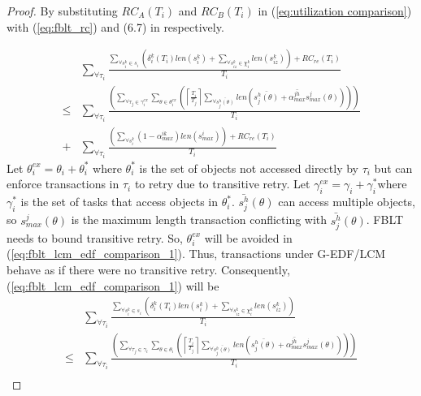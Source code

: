 \documentclass[12pt,english]{report}
\newtheorem{proof}{Proof}
\begin{document}
\begin{proof}

By substituting $RC_{A}(T_{i})$ and $RC_{B}(T_{i})$ in (\ref{eq:utilization comparison})
with (\ref{eq:fblt_rc}) and (6.7) in \cite{shambake_phd_proposal}
respectively. 

\begin{eqnarray}
 & \sum_{\forall\tau_{i}}\frac{\sum_{\forall s_{i}^{k}\in s_{i}}\left(\delta_{i}^{k}(T_{i})len(s_{i}^{k})+\sum_{\forall s_{iz}^{k}\in\chi_{i}^{k}}len(s_{iz}^{k})\right)+RC_{re}(T_{i})}{T_{i}}\label{eq:fblt_lcm_edf_comparison_1}\\
\le & \sum_{\forall\tau_{i}}\frac{\left(\sum_{\forall\tau_{j}\in\gamma_{i}^{ex}}\sum_{\theta\in\theta_{i}^{ex}}\left(\left\lceil \frac{T_{i}}{T_{j}}\right\rceil \sum_{\forall\bar{s_{j}^{h}(\theta)}}len\left(\bar{s_{j}^{h}(\theta)}+\bar{\alpha_{max}^{jh}}s_{max}^{j}(\theta)\right)\right)\right)}{T_{i}}\nonumber \\
+ & \sum_{\forall\tau_{i}}\frac{\left(\sum_{\forall s_{i}^{k}}\left(1-\alpha_{max}^{ik}\right)len\left(s_{max}^{i}\right)\right)+RC_{re}(T_{i})}{T_{i}}\nonumber 
\end{eqnarray}
Let $\theta_{i}^{ex}=\theta_{i}+\theta_{i}^{*}$ where $\theta_{i}^{*}$
is the set of objects not accessed directly by $\tau_{i}$ but can
enforce transactions in $\tau_{i}$ to retry due to transitive retry.
Let $\gamma_{i}^{ex}=\gamma_{i}+\gamma_{i}^{*}$where $\gamma_{i}^{*}$
is the set of tasks that access objects in $\theta_{i}^{*}$. $\bar{s_{j}^{h}}(\theta)$
can access multiple objects, so $s_{max}^{j}(\theta)$ is the maximum
length transaction conflicting with $\bar{s_{j}^{h}}(\theta)$. FBLT
needs to bound transitive retry. So, $\theta_{i}^{ex}$ will be avoided
in (\ref{eq:fblt_lcm_edf_comparison_1}). Thus, transactions under G-EDF/LCM
behave as if there were no transitive retry. Consequently, (\ref{eq:fblt_lcm_edf_comparison_1})
will be 
\begin{eqnarray}
 & \sum_{\forall\tau_{i}}\frac{\sum_{\forall s_{i}^{k}\in s_{i}}\left(\delta_{i}^{k}(T_{i})len(s_{i}^{k})+\sum_{\forall s_{iz}^{k}\in\chi_{i}^{k}}len(s_{iz}^{k})\right)}{T_{i}}\label{eq:fblt_lcm_edf_comparison_2}\\
\le & \sum_{\forall\tau_{i}}\frac{\left(\sum_{\forall\tau_{j}\in\gamma_{i}}\sum_{\theta\in\theta_{i}}\left(\left\lceil \frac{T_{i}}{T_{j}}\right\rceil \sum_{\forall\bar{s_{j}^{h}(\theta)}}len\left(\bar{s_{j}^{h}(\theta)}+\bar{\alpha_{max}^{jh}}s_{max}^{j}(\theta)\right)\right)\right)}{T_{i}}\nonumber \\

\end{eqnarray}
\end{proof}
\end{document}
